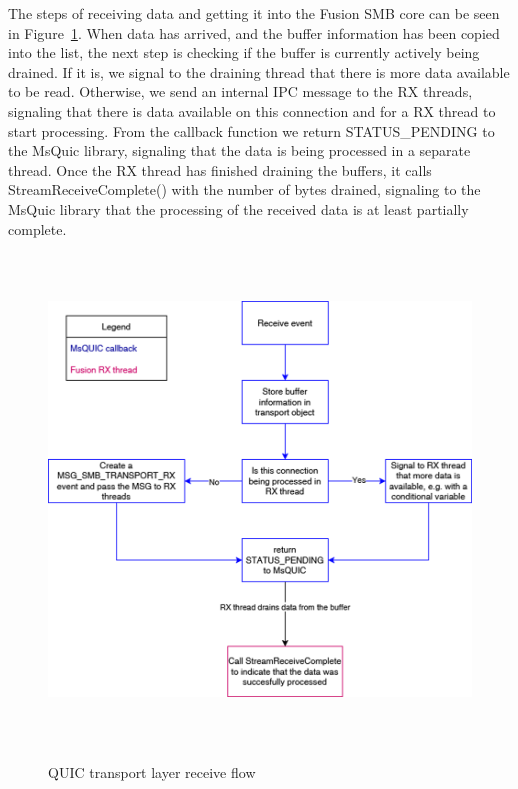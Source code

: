 \documentclass[english, 12pt, a4paper, elec, utf8, a-2b, online]{aaltothesis}
\begin{document}
The steps of receiving data and getting it into the Fusion SMB core can be seen in Figure~\ref{fig:msquic_rx}.
When data has arrived, and the buffer information has been copied into the list, the
next step is checking if the buffer is currently actively being drained. If it is,
we signal to the draining thread that there is more data available to be read. Otherwise,
we send an internal IPC message to the RX threads, signaling that there is data available
on this connection and for a RX thread to start processing. From the callback function
we return STATUS\_PENDING to the MsQuic library, signaling that the data is being
processed in a separate thread. Once the RX thread has finished draining the buffers,
it calls StreamReceiveComplete() with the number of bytes drained, signaling to the
MsQuic library that the processing of the received data is at least partially complete. 
\begin{figure}[h]
	\centering
	\includegraphics[alt={Block diagram of the flow when receiving data using the MsQuic library}, height=13cm]{./images/receive_flow.png}
	\caption{QUIC transport layer receive flow}
	\label{fig:msquic_rx}
\end{figure}
\end{document}
